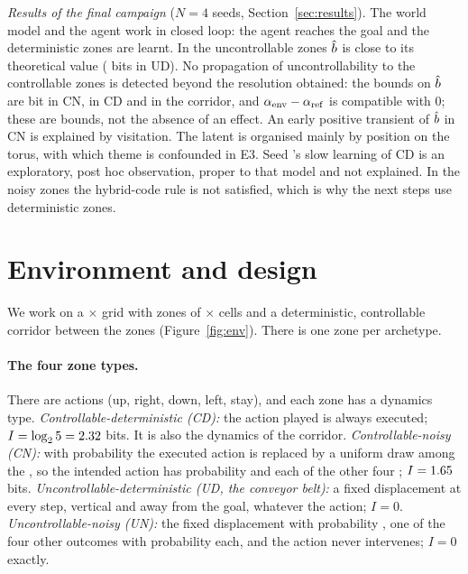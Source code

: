 \documentclass[10pt]{article}
\begin{document}
\emph{Results of the final campaign} ($N = 4$ seeds, Section~\ref{sec:results}). %
The world model and the agent work in closed loop: the agent reaches the goal and the deterministic zones are learnt.
In the uncontrollable zones $\hat{b}$ is close to its theoretical value (\eThreeCampaignBUDMean{} bits in UD).
No propagation of uncontrollability to the controllable zones is detected beyond the resolution obtained: the bounds on
$\hat{b}$ are \eThreeCampaignBoundCN{} bit in CN, \eThreeCampaignBoundCD{} in CD and \eThreeCampaignBoundCorridor{} in
the corridor, and $\alpha_{\mathrm{env}} - \alpha_{\mathrm{ref}}$ is compatible with 0; these are bounds, not the %
absence of an effect. An early positive transient of $\hat{b}$ in CN is explained by visitation. The latent is organised
mainly by position on the torus, with which theme is confounded in E3. Seed \eThreeCampaignSeedA's slow learning of CD
is an exploratory, post hoc observation, proper to that model and not explained. In the noisy zones the hybrid-code
rule is not satisfied, which is why the next steps use deterministic zones.

\tableofcontents

\section{Environment and design}
\label{sec:env}

We work on a \eThreeGridSize$\times$\eThreeGridSize{} grid with \eThreeNZones{} zones of
\eThreeZoneSize$\times$\eThreeZoneSize{} cells and a deterministic, controllable corridor between the zones
(Figure~\ref{fig:env}).
There is one zone per archetype.

\paragraph{The four zone types.}
There are \eThreeNActions{} actions (up, right, down, left, stay), and each zone has a dynamics type.
\emph{Controllable-deterministic (CD):} the action played is always executed; $I = \log_{2} 5 = 2.32$
bits. It is also the dynamics of the corridor.
\emph{Controllable-noisy (CN):} with probability \eThreeNoiseP{} the executed action is replaced by a uniform draw among
the \eThreeNActions, so the intended action has probability \eThreeNoiseMain{} and each of the other four
\eThreeNoiseMinor; $I = 1.65$ bits.
\emph{Uncontrollable-deterministic (UD, the conveyor belt):} a fixed displacement at every step, vertical and away from
the goal, whatever the action; $I = 0$. %
\emph{Uncontrollable-noisy (UN):} the fixed displacement with probability \eThreeNoiseMain, one of the four other
outcomes with probability \eThreeNoiseMinor{} each, and the action never intervenes; $I = 0$ exactly. %
\end{document}
